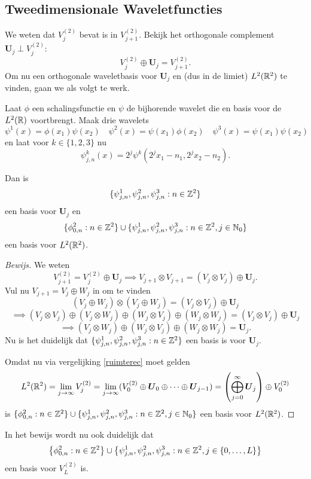 \subsection{Tweedimensionale Waveletfuncties}
We weten dat $V_j^{(2)}$ bevat is in $V_{j+1}^{(2)}$. Bekijk het orthogonale complement $\boldsymbol{U}_j \perp V_j^{(2)}$:
\begin{equation}
  \label{2d_ruimte_rec}
  V_j^{(2)} \oplus \boldsymbol{U}_j = V_{j+1}^{(2)}.
\end{equation}
Om nu een orthogonale waveletbasis voor $\boldsymbol{U}_j$ en (dus in de limiet) $L^2(\mathbb{R}^2)$ te vinden, gaan we als volgt te werk.
\begin{stelling}
\label{mallatbasis}
  Laat $\phi$ een schalingsfunctie en $\psi$ de bijhorende wavelet die en basis voor de $L^2(\mathbb{R})$ voortbrengt. Maak drie wavelets
  \begin{equation}
    \label{psi_k_defs}
    \psi^1(x) = \phi(x_1)\psi(x_2) \quad \psi^2(x) = \psi(x_1) \phi(x_2) \quad \psi^3(x) = \psi(x_1)\psi(x_2)
  \end{equation}
  en laat voor $k \in \{1,2,3\}$ nu
  \[
  \psi^k_{j,n}(x) = 2^j \psi^k\left( 2^jx_1 - n_1, 2^j x_2 - n_2 \right).
  \]

  Dan is
  \[
  \{ \psi^1_{j,n}, \psi^2_{j,n}, \psi^3_{j,n}: n \in \mathbb{Z}^2 \}
  \] een basis voor $\boldsymbol{U}_j$
  en
  \[
  \{ \phi_{0, n}^2: n \in \mathbb{Z}^2 \} \cup \{ \psi^1_{j,n}, \psi^2_{j,n}, \psi^3_{j,n}: n \in \mathbb{Z}^2, j \in \mathbb{N}_0 \}
  \] een basis voor $L^2(\mathbb{R}^2)$.
\end{stelling}
\begin{proof}[Bewijs]
  We weten
  \[
  V_{j+1}^{(2)} = V_j^{(2)} \oplus \boldsymbol{U}_j \implies V_{j+1} \otimes V_{j+1} = ( V_j \otimes V_j ) \oplus \boldsymbol{U}_j.
  \]
  Vul nu $V_{j+1} = V_j \oplus W_j$ in om te vinden
  \[
  ( V_j \oplus W_j ) \otimes (V_j \oplus W_j ) = (V_j \otimes V_j) \oplus \boldsymbol{U}_j
  \]
  \[
  \implies (V_j \otimes V_j) \oplus (V_j \otimes W_j) \oplus (W_j \otimes V_j) \oplus (W_j \otimes W_j) = (V_j \otimes V_j) \oplus \boldsymbol{U}_j
  \]
  \[
  \implies (V_j \otimes W_j) \oplus (W_j \otimes V_j) \oplus (W_j \otimes W_j) = \boldsymbol{U}_j.
  \]
  Nu is het duidelijk dat $\{ \psi^1_{j,n}, \psi^2_{j,n}, \psi^3_{j,n}: n \in \mathbb{Z}^2 \}$ een basis is voor $\boldsymbol{U}_j$.

Omdat nu via vergelijking \ref{ruimterec} moet gelden
\[
	L^2(\mathbb{R}^2) = \lim_{j \to \infty} V_j^{(2)} = \lim_{j \to \infty} ( V_0^{(2)} \oplus \boldsymbol{U}_0 \oplus \cdots \oplus \boldsymbol{U}_{j-1} ) = \left( \bigoplus_{j=0}^\infty \boldsymbol{U}_j \right) \oplus V_0^{(2)}
\]
is $\{ \phi_{0, n}^2: n \in \mathbb{Z}^2 \} \cup \{ \psi^1_{j,n}, \psi^2_{j,n}, \psi^3_{j,n}: n \in \mathbb{Z}^2, j \in \mathbb{N}_0 \}$ een basis voor $L^2(\mathbb{R}^2)$.
\end{proof}
\begin{gevolg}
In het bewijs wordt nu ook duidelijk dat 
\[
	\left\{ \phi_{0, n}^2: n \in \mathbb{Z}^2 \right\} \cup \left\{ \psi^1_{j,n}, \psi^2_{j,n}, \psi^3_{j,n}: n \in \mathbb{Z}^2, j \in \{0, \ldots, L \}  \right\}
\]
een basis voor $V_L^{(2)}$ is.
\end{gevolg}


